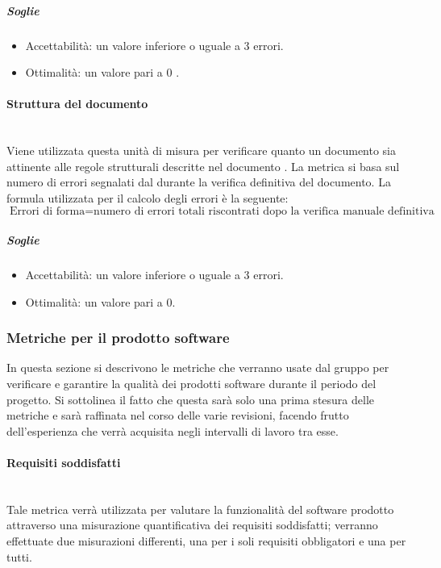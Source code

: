 \subparagraph{Soglie}
\begin{itemize}
\item Accettabilità: un valore inferiore o uguale a 3 errori.
\item Ottimalità: un valore pari a 0 .
\end{itemize}

\paragraph{Struttura del documento}
\label{AppB:ErroriForma}
	~\\Viene utilizzata questa unità di misura per verificare quanto un documento sia attinente alle regole strutturali descritte nel documento \NdP{}.
La metrica si basa sul numero di errori segnalati dal \ver{} durante la verifica definitiva del documento.
\newline La formula utilizzata per il calcolo degli errori è la seguente:
\begin{displaymath}
\mbox{Errori di forma}={\mbox{numero di errori totali riscontrati dopo la verifica manuale definitiva}}
\end{displaymath}

\subparagraph{Soglie}
\begin{itemize}
\item Accettabilità: un valore inferiore o uguale a 3 errori.
\item Ottimalità: un valore pari a 0.
\end{itemize}

\subsubsection{Metriche per il prodotto software}
\label{AppB:metricheSoft}
In questa sezione si descrivono le metriche che verranno usate dal gruppo per verificare e garantire la qualità dei prodotti software durante il periodo del progetto. Si sottolinea il fatto che questa sarà solo una prima stesura delle metriche e sarà raffinata nel corso delle varie revisioni, facendo frutto dell'esperienza che verrà acquisita negli intervalli di lavoro tra esse.

\paragraph{Requisiti soddisfatti}
\label{AppB:Funzionalita}
	~\\Tale metrica verrà utilizzata per valutare la funzionalità del software prodotto attraverso una misurazione quantificativa dei requisiti soddisfatti; verranno effettuate due misurazioni differenti, una per i soli requisiti obbligatori e una per tutti.

